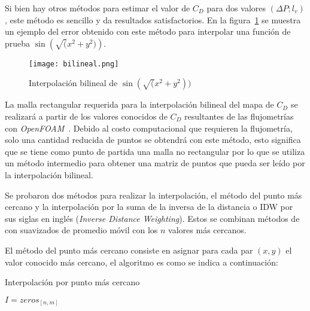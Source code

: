 Si bien hay otros métodos para estimar el valor de $C_D$ para dos valores $(\Delta
P; l_v)$, este método es sencillo y da resultados satisfactorios.
%
En la figura~\ref{fig:bilineal} se muestra un ejemplo del error obtenido con
este método para interpolar una función de prueba $\sin\left(\sqrt(x^2 + y^2)\right)$.

\begin{figure}
    \centering
    \texttt{[image: bilineal.png]}
    \caption{Interpolación bilineal de $\sin(\sqrt(x^2 + y^2))$}\label{fig:bilineal}
\end{figure}

La malla rectangular requerida para la interpolación bilineal del mapa de
$C_{D}$ se realizará a partir de los valores conocidos de $C_D$ resultantes de
las flujometrías con \emph{OpenFOAM}~\parencite{openfoam}.
%
Debido al costo computacional que requieren la flujometría, solo una cantidad
reducida de puntos se obtendrá con este método, esto  significa que se tiene
como punto de partida una malla no rectangular por lo que se utiliza un método
intermedio para obtener una matriz de puntos que pueda ser leído por la
interpolación bilineal.

Se probaron dos métodos para realizar la interpolación, el método del punto más
cercano y la interpolación por la suma de la inversa de la distancia o IDW por
sus siglas en inglés (\emph{Inverse Distance Weighting}).
%
Estos se combinan métodos de con suavizados de promedio móvil con los $n$
valores más cercanos.

El método del punto más cercano consiste en asignar para cada par $(x, y)$ el
valor conocido más cercano, el algoritmo es como se indica a continuación:

\begin{algorithm}
 \caption{Interpolación por punto más cercano}\label{algo:mas_cercano}


    \BlankLine
     $I=zeros_{[n,m]}$\;
\end{algorithm}

